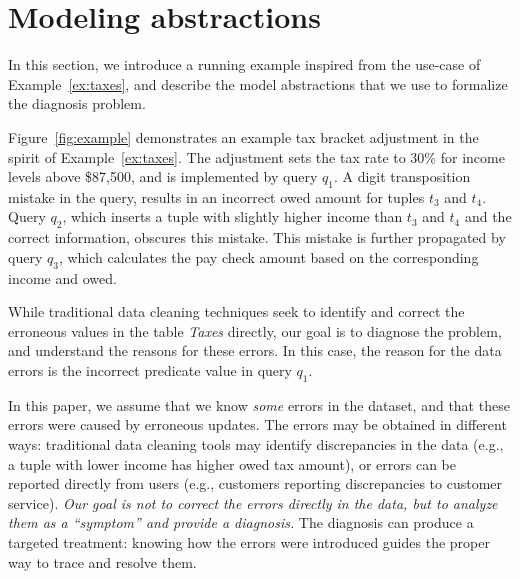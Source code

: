 
\section{Modeling abstractions}
\label{sec:abstractions}

In this section, we introduce a running example inspired from the use-case of
Example~\ref{ex:taxes}, and describe the model abstractions that we use to
formalize the diagnosis problem.





\begin{example}\label{ex:taxes2}
Figure~\ref{fig:example} demonstrates an example tax bracket adjustment in the
spirit of Example~\ref{ex:taxes}. The adjustment sets the tax rate to 30\% for
income levels above \$87,500, and is implemented by query $q_1$. A digit
transposition mistake in the query, results in an incorrect owed amount for tuples
$t_3$ and $t_4$. Query $q_2$, which inserts a tuple with slightly higher
income than $t_3$ and $t_4$ and the correct information, obscures this mistake.
This mistake is further propagated by query $q_3$, which calculates the pay 
check amount based on the corresponding
income and owed. 
\iffalse    
Figure~\ref{fig:example} demonstrates an example tax bracket adjustment in the
spirit of Example~\ref{ex:taxes}. The adjustment sets the tax rate to 30\% for
income levels above \$87,500, and is implemented by query $q_1$. A digit
transposition mistake in the query, results in an incorrect tax rate for tuples
$t_3$ and $t_4$. Query $q_2$ that calculates the amount owed based on the corresponding
tax rate and income propagates the error to other fields. The mistake is
further obscured by query $q_3$, which inserts a tuple with slightly higher
income than $t_3$ and $t_4$ and the correct (lower) tax rate.
\fi
\end{example}
\vspace*{-0.07in}
While traditional data cleaning techniques seek to identify and correct the
erroneous values in the table \emph{Taxes} directly, our goal is to diagnose
the problem, and understand the reasons for these errors. In this case, the
reason for the data errors is the incorrect predicate value in query $q_1$.

In this paper, we assume that we know \emph{some} errors in the dataset, and
that these errors were caused by erroneous updates. The errors may be
obtained in different ways: traditional data cleaning tools may identify
discrepancies in the data (e.g., a tuple with lower income has higher owed tax
amount), or errors can be reported directly from users (e.g., customers
reporting discrepancies to customer service). \emph{Our goal is not to correct
the errors directly in the data, but to analyze them as a ``symptom'' and provide a
diagnosis.} The diagnosis can produce a targeted treatment: knowing how the
errors were introduced guides the proper way to trace and resolve them.


